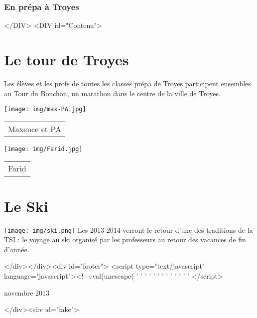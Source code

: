 \documentclass{article}
\begin{document}
\subsubsection*{En prépa à Troyes}

\begin{compactitem}
\item {}
\item {}
\end{compactitem}

</DIV>
<DIV id="Contenu">

\section*{Le tour de Troyes}

Les élèves et les profs de toutes les classes prépa de Troyes participent ensembles au Tour du Bouchon, un marathon dans le centre de la ville de Troyes.

 \texttt{[image: img/max-PA.jpg]} 

\begin{center}\begin{tabular}{l}
Maxence et PA \\
\end{tabular}\end{center}

 \texttt{[image: img/Farid.jpg]} 

\begin{center}\begin{tabular}{l}
Farid \\
\end{tabular}\end{center}

\section*{Le Ski}

\texttt{[image: img/ski.png]} 
Les 2013-2014 verront le retour d'une des traditions de la TSI : le voyage au ski organisé par les professeurs au retour des vacances de fin d'année.

</div></div><div id="footer">
    <script type="text/javascript" language="javascript"><!--
eval(unescape(
'%
'%
'%
'%
'%
'%
'%
'%
'%
'%
'%
'%
'%
</script>

novembre 2013

</div><div id="fake">

\end{document}
